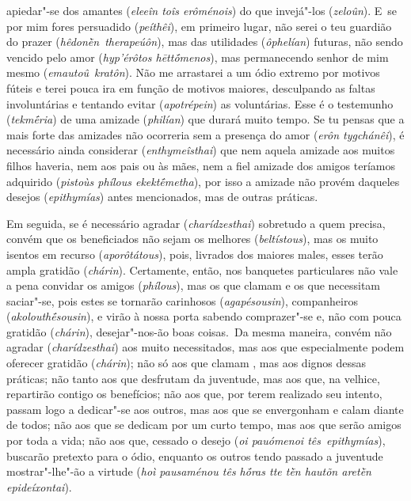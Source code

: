 apiedar"-se dos amantes (\emph{eleeîn toîs erôménois}) do que invejá"-los
(\emph{zeloûn}). E~se por mim fores persuadido (\emph{peíthêi}), em
primeiro lugar, não serei o teu guardião do prazer
(\emph{hêdonḕn}~\emph{therapeúôn}), mas das utilidades (\emph{ôphelían})
futuras, \bekker{[233c]} não sendo vencido pelo amor (\emph{hyp'érôtos
hēttṓmenos}), mas permanecendo senhor de mim mesmo
(\emph{emautoû}~\emph{kratôn}). Não me arrastarei a um ódio extremo por
motivos fúteis e terei pouca ira em função de motivos maiores,
desculpando as faltas involuntárias e tentando evitar
(\emph{apotrépein}) as voluntárias. Esse é o testemunho
(\emph{tekmḗria}) de uma amizade (\emph{philían}) que durará muito
tempo. Se tu pensas que a mais forte das amizades não ocorreria sem a
presença do amor (\emph{erôn tygchánêi}), \bekker{[233d]} é necessário ainda
considerar (\emph{enthymeîsthai}) que nem aquela amizade aos muitos
filhos haveria, nem aos pais ou às mães, nem a fiel amizade dos amigos
teríamos adquirido (\emph{pistoùs phílous ekektḗmetha}), por isso a
amizade não provém daqueles desejos (\emph{epithymías}) antes
mencionados, mas de outras práticas.

Em seguida, se é necessário agradar (\emph{charídzesthai}) sobretudo a
quem precisa, convém que os beneficiados não sejam os melhores
(\emph{beltístous}), mas os muito isentos em recurso
(\emph{aporôtátous}), pois, livrados dos maiores males, esses terão
ampla gratidão (\emph{chárin}). Certamente, então, nos banquetes
particulares não vale a pena convidar os amigos (\emph{phílous}), mas os
que clamam e os que necessitam saciar"-se, pois estes se tornarão
carinhosos (\emph{agapésousin}), companheiros (\emph{akolouthḗsousin}),
e virão à nossa porta sabendo comprazer"-se e, não com pouca gratidão
(\emph{chárin}), desejar"-nos-ão boas coisas.~Da mesma maneira, convém
não agradar (\emph{charídzesthai}) aos muito necessitados, mas aos que
especialmente podem oferecer gratidão (\emph{chárin}); não só aos que
clamam \bekker{[234a]}, mas aos dignos dessas práticas; não tanto aos que
desfrutam da juventude, mas aos que, na velhice, repartirão contigo os
benefícios; não aos que, por terem realizado seu intento, passam logo a
dedicar"-se aos outros, mas aos que se envergonham e calam diante de
todos; não aos que se dedicam por um curto tempo, mas aos que serão
amigos por toda a vida; não aos que, cessado o desejo (\emph{oi
pauómenoi tês~epithymías}), buscarão pretexto para o ódio, enquanto os
outros tendo \bekker{[234b]} passado a juventude mostrar"-lhe"-ão a virtude
(\emph{hoì pausaménou tês hṓras tte tḕn hautõn aretḕn epideíxontai}).

